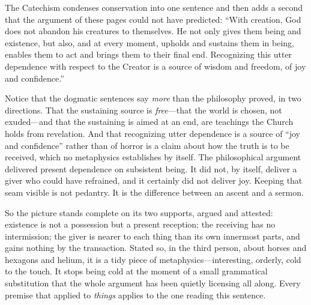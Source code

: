 The Catechism condenses conservation into one sentence and then adds a second that the argument of these pages could not have predicted: ``With creation, God does not abandon his creatures to themselves. He not only gives them being and existence, but also, and at every moment, upholds and sustains them in being, enables them to act and brings them to their final end. Recognizing this utter dependence with respect to the Creator is a source of wisdom and freedom, of joy and confidence.''

Notice that the dogmatic sentences say \emph{more} than the philosophy proved, in two directions. That the sustaining source is \emph{free}---that the world is chosen, not exuded---and that the sustaining is aimed at an end, are teachings the Church holds from revelation. And that recognizing utter dependence is a source of ``joy and confidence'' rather than of horror is a claim about how the truth is to be received, which no metaphysics establishes by itself. The philosophical argument delivered present dependence on subsistent being. It did not, by itself, deliver a giver who could have refrained, and it certainly did not deliver joy. Keeping that seam visible is not pedantry. It is the difference between an ascent and a sermon.

So the picture stands complete on its two supports, argued and attested: existence is not a possession but a present reception; the receiving has no intermission; the giver is nearer to each thing than its own innermost parts, and gains nothing by the transaction. Stated so, in the third person, about horses and hexagons and helium, it is a tidy piece of metaphysics---interesting, orderly, cold to the touch. It stops being cold at the moment of a small grammatical substitution that the whole argument has been quietly licensing all along. Every premise that applied to \emph{things} applies to the one reading this sentence.
